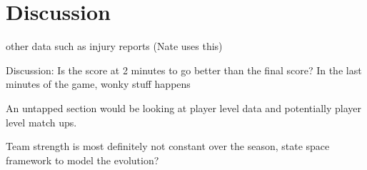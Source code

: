 \section{Discussion}
other data such as injury reports (Nate uses this)

Discussion: Is the score at 2 minutes to go better than the final score? In the last minutes of the game, wonky stuff happens

An untapped section would be looking at player level data and potentially player level match ups. 

Team strength is most definitely not constant over the season, state space framework to model the evolution?